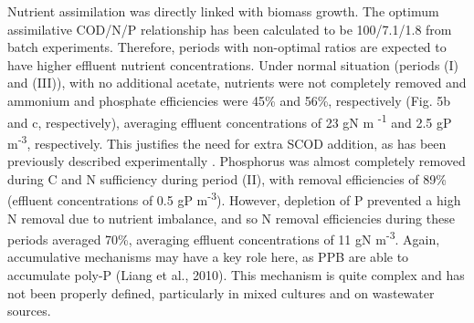 Nutrient assimilation was directly linked with biomass growth. The optimum assimilative COD/N/P relationship has been calculated to be 100/7.1/1.8 from batch experiments. Therefore, periods with non-optimal ratios are expected to have higher effluent nutrient concentrations. Under normal situation (periods (I) and (III)), with no additional acetate, nutrients were not completely removed and ammonium and phosphate efficiencies were 45\% and 56\%, respectively (Fig. 5b and c, respectively), averaging effluent concentrations of 23 gN m \textsuperscript{-1} and 2.5 gP m\textsuperscript{-3}, respectively. This justifies the need for extra SCOD addition, as has been previously described experimentally \cite{Hulsen2016}. Phosphorus was almost completely removed during C and N sufficiency during period (II), with removal efficiencies of 89\% (effluent concentrations of 0.5 gP m\textsuperscript{-3}). However, depletion of P prevented a high N removal due to nutrient imbalance, and so N removal efficiencies during these periods averaged 70\%, averaging effluent concentrations of 11 gN m\textsuperscript{-3}. Again, accumulative mechanisms may have a key role here, as PPB are able to accumulate poly-P (Liang et al., 2010). This mechanism is quite complex and has not been properly defined, particularly in mixed cultures and on wastewater sources.

